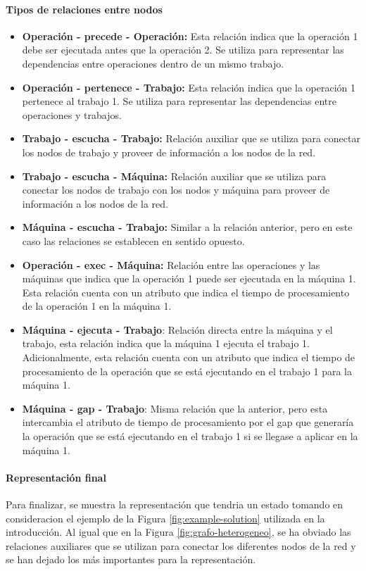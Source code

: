 \paragraph{Tipos de relaciones entre nodos}
\begin{itemize}
    \item \textbf{Operación - precede - Operación:} Esta relación indica que la operación 1 debe ser
    ejecutada antes que la operación 2. Se utiliza para representar las dependencias entre operaciones
    dentro de un mismo trabajo.
    \item \textbf{Operación - pertenece - Trabajo:} Esta relación indica que la operación 1 pertenece
    al trabajo 1. Se utiliza para representar las dependencias entre operaciones y trabajos.
    \item \textbf{Trabajo - escucha - Trabajo:} Relación auxiliar que se utiliza para conectar los
    nodos de trabajo y proveer de información a los nodos de la red.
    \item \textbf{Trabajo - escucha - Máquina:} Relación auxiliar que se utiliza para conectar los
    nodos de trabajo con los nodos y máquina para proveer de información a los nodos de la red.
    \item \textbf{Máquina - escucha - Trabajo:} Similar a la relación anterior, pero en este caso
    las relaciones se establecen en sentido opuesto.
    \item \textbf{Operación - exec - Máquina:} Relación entre las operaciones y las máquinas que indica
    que la operación 1 puede ser ejecutada en la máquina 1. Esta relación cuenta con un atributo que
    indica el tiempo de procesamiento de la operación 1 en la máquina 1.
    \item \textbf{Máquina - ejecuta - Trabajo}: Relación directa entre la máquina y el trabajo, esta
    relación indica que la máquina 1 ejecuta el trabajo 1. Adicionalmente, esta relación cuenta con
    un atributo que indica el tiempo de procesamiento de la operación que se está ejecutando en el
    trabajo 1 para la máquina 1.
    \item \textbf{Máquina - gap - Trabajo}: Misma relación que la anterior, pero esta intercambia el
    atributo de tiempo de procesamiento por el gap que generaría la operación que se está ejecutando
    en el trabajo 1 si se llegase a aplicar en la máquina 1.
\end{itemize}

\paragraph{Representación final}
Para finalizar, se muestra la representación que tendria un estado tomando en consideracion el ejemplo 
de la Figura \ref{fig:example-solution} utilizada en la introducción. Al igual que en la Figura 
\ref{fig:grafo-heterogeneo}, se ha obviado las relaciones auxiliares que se utilizan para
conectar los diferentes nodos de la red y se han dejado los más importantes para la representación. 

